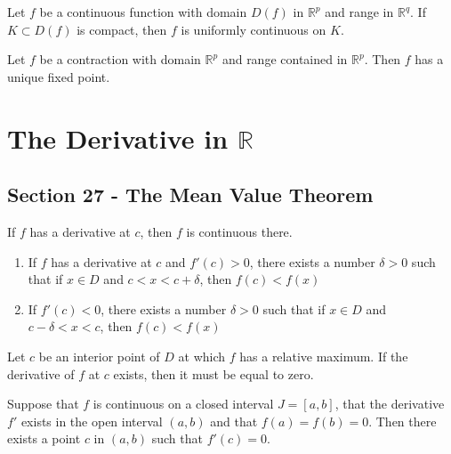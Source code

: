 \documentclass[12pt]{article}
\newcommand{\R}{\mathbb{R}}
\newenvironment{theorem}[2][Theorem]{\begin{trivlist}
\item[\hskip \labelsep {\bfseries #1}\hskip \labelsep {\bfseries #2.}]}{\end{trivlist}}
\newenvironment{lemma}[2][Lemma]{\begin{trivlist}
\item[\hskip \labelsep {\bfseries #1}\hskip \labelsep {\bfseries #2.}]}{\end{trivlist}}
\begin{document}
\begin{theorem}[Uniform Continuity]{Theorem}
Let $f$ be a continuous function with domain $D(f)$ in $\R^p$ and range in $\R^q$. If $K \subset D(f)$ is compact, then $f$ is uniformly continuous on $K$.
\end{theorem}

\begin{theorem}[Fixed Point]{Theorem}
Let $f$ be a contraction with domain $\R^p$ and range contained in $\R^p$. Then $f$ has a unique fixed point.
\end{theorem}
\newpage
\section{The Derivative in $\R$}

\subsection*{Section 27 - The Mean Value Theorem}

\begin{lemma}{27.2}
If $f$ has a derivative at $c$, then $f$ is continuous there.
\end{lemma}

\begin{lemma}{27.3}
\begin{enumerate}[label=\alph*)]
\item If $f$ has a derivative at $c$ and $f'(c) > 0$, there exists a number $\delta > 0$ such that if $x \in D$ and $c < x < c + \delta$, then $f(c) < f(x)$
\item If $f'(c) < 0$, there exists a number $\delta > 0$ such that if $x \in D$ and $c - \delta < x < c$, then $f(c) < f(x)$
\end{enumerate}
\end{lemma}

\begin{theorem}[Interior Maximum]{Theorem}
Let $c$ be an interior point of $D$ at which $f$ has a relative maximum. If the derivative of $f$ at $c$ exists, then it must be equal to zero.
\end{theorem}

\begin{theorem}[Rolle's]{Theorem}
Suppose that $f$ is continuous on a closed interval $J = [a, b]$, that the derivative $f'$ exists in the open interval $(a, b)$ and that $f(a) = f(b) = 0$. Then there exists a point $c$ in $(a, b)$ such that $f'(c) = 0$.
\end{theorem}
\end{document}
